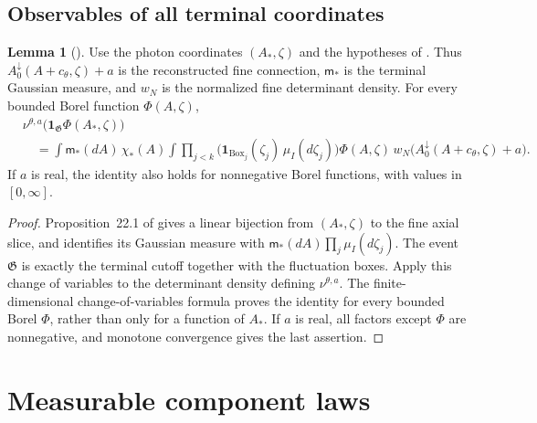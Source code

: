 \documentclass[11pt,letterpaper,reqno]{amsart}
\theoremstyle{definition}
\newtheorem{qcmlemma}[qcmproposition]{Lemma}
\newenvironment{lemma}[1][]{\pushQED{\qed}\renewcommand{\qedsymbol}{$\blacksquare$}\begin{qcmlemma}[#1]}{\popQED\end{qcmlemma}}
\begin{document}
\subsection{Observables of all terminal coordinates}
\begin{lemma}\label{qcm:terminal-coordinate-observable}
Use the photon coordinates $(A_*,\zeta)$ and the hypotheses of
\cite[Proposition~22.1 and Theorem~22.2]{QEDConstruction}.
Thus $A_0^\downarrow(A+c_\theta,\zeta)+a$ is the reconstructed
fine connection, $\mathsf m_*$ is the terminal Gaussian measure,
and $w_N$ is the normalized fine determinant density.
For every bounded Borel function $\Phi(A,\zeta)$,
\begin{align*}
 &\nu^{\theta,a}
       \bigl(\mathbf1_{\mathfrak G}\Phi(A_*,\zeta)\bigr)\\
 &\quad=\int\mathsf m_*(dA)\,\chi_*(A)
   \int\prod_{j<k}
       \bigl(\mathbf1_{\mathrm{Box}_j}(\zeta_j)\,\mu_I(d\zeta_j)\bigr)
   \Phi(A,\zeta)\,
   w_N\bigl(A_0^\downarrow(A+c_\theta,\zeta)+a\bigr).
\end{align*}
If $a$ is real, the identity also holds for nonnegative Borel
functions, with values in $[0,\infty]$.
\end{lemma}
\begin{proof}
Proposition~22.1 of \cite{QEDConstruction} gives a linear bijection from $(A_*,\zeta)$ to the
fine axial slice, and identifies its Gaussian measure with
$\mathsf m_*(dA)\prod_j\mu_I(d\zeta_j)$.
The event $\mathfrak G$ is exactly the terminal cutoff together
with the fluctuation boxes. Apply this change of variables to
the determinant density defining $\nu^{\theta,a}$.
The finite-dimensional change-of-variables formula proves the
identity for every bounded Borel $\Phi$, rather than only for a
function of $A_*$. If $a$ is real, all factors except $\Phi$
are nonnegative, and monotone convergence gives the last assertion.
\end{proof}

\section{Measurable component laws}
\label{app:qcm-components}
\end{document}
